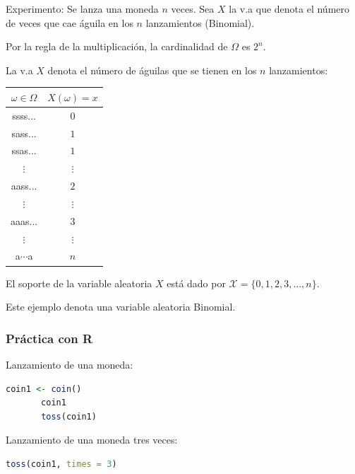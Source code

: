 \begin{example}
Experimento: Se lanza una moneda $n$ veces. Sea $X$ la v.a que denota el número de veces que cae águila en los $n$ lanzamientos (Binomial). 

Por la regla de la multiplicación, la cardinalidad de $\Omega $ es $2^{n}$.

La v.a $X$ denota el número de águilas que se tienen en los $n$ lanzamientos:
\begin{center}
\begin{tabular}{cc}
\hline
$\omega \in \Omega $ & $X(\omega )=x$ \\ \hline
ssss... & $0$ \\ 
sass... & $1$ \\ 
ssas... & $1$ \\ 
$\vdots $ & $\vdots $ \\ 
aass... & $2$ \\ 
$\vdots $ & $\vdots $ \\ 
aaas... & $3$ \\ 
$\vdots $ & $\vdots $ \\ 
a$\cdots $a & $n$ \\ \hline
\end{tabular}
\end{center}

El soporte de la variable aleatoria $X$ está dado por $\mathcal{X}=\{0,1,2,3,...,n\}$.
\end{example}

\begin{remark}
Este ejemplo denota una variable aleatoria Binomial.
\end{remark}




\subsubsection{Práctica con R}


Lanzamiento de una moneda:
\begin{lstlisting}[language=R]
       coin1 <- coin()
       coin1
       toss(coin1)
\end{lstlisting}

Lanzamiento de una moneda tres veces:
\begin{lstlisting}[language=R]
       toss(coin1, times = 3)
\end{lstlisting}

